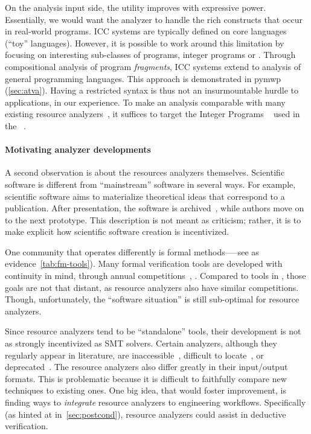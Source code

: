 On the analysis input side, the utility improves with expressive
power. Essentially, we would want the analyzer to handle
the rich constructs that occur in real-world programs. ICC systems are typically
defined on core languages (\enquote{toy} languages). However, it is possible to
work around this limitation by focusing on interesting sub-classes of programs,
\eg integer programs or . Through
compositional analysis of program \emph{fragments}, ICC
systems extend to analysis of general programming languages. This approach is
demonstrated in pymwp (\autoref{sec:atva}). Having a restricted syntax is thus
not an insurmountable hurdle to applications, in our experience. To make an
analysis comparable with many existing resource analyzers~\cite{flores17}, it suffices to target the  Integer Programs
~\cite{cinteger} used in the ~\cite{giesl2019}.

\paragraph*{Motivating analyzer developments}
A second observation is about the resources analyzers themselves. Scientific
software is different from \enquote{mainstream} software in several ways. For
example, scientific software aims to materialize theoretical ideas that
correspond to a publication. After presentation, the software is
archived~\cite{acm_badging}, while authors move on to the next prototype. This
description is not meant as criticism; rather, it is to make explicit how
scientific software creation is incentivized.

One community that operates differently is formal methods—--see as
evidence~\autoref{tab:fm-tools}). Many formal verification tools are developed
with continuity in mind, through annual competitions~\cite{casc,beyer2022},
\etc. Compared to tools in , those goals are not that
distant, as resource analyzers also have similar competitions. Though,
unfortunately, the \enquote{software situation} is still sub-optimal for
resource analyzers.

Since resource analyzers tend to be \enquote{standalone} tools, their
development is not as strongly incentivized as \eg SMT solvers. Certain
analyzers, although they regularly appear in literature, are
inaccessible~\cite{sinn2017}, difficult to locate~\cite{carbonneaux2015}, or
deprecated~\cite{gulwani2009,srikanth2017}. The resource analyzers also differ
greatly in their input/output formats. This is problematic because it is
difficult to faithfully compare new techniques to existing ones. One big idea,
that would foster improvement, is finding ways to \emph{integrate} resource
analyzers to engineering workflows. Specifically (as hinted at
in~\autoref{sec:postcond}), resource analyzers could assist in deductive
verification.

